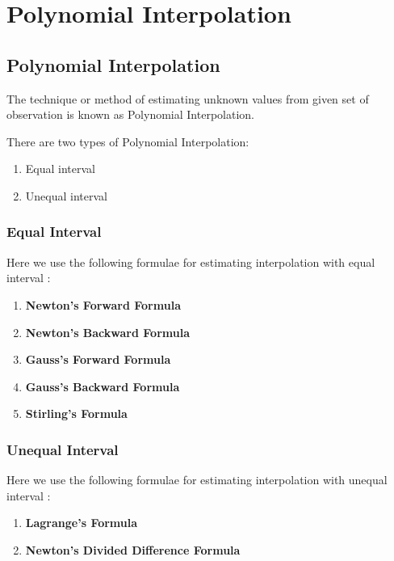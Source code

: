 \newpage
\chapter{Polynomial Interpolation}

\section{Polynomial Interpolation}

The technique or method of estimating unknown values from given set of observation is known as Polynomial Interpolation.

There are two types of Polynomial Interpolation:

\begin{enumerate}
    \item Equal interval
    \item Unequal interval
\end{enumerate}

\subsection{Equal Interval}

Here we use the following formulae for estimating interpolation with equal interval :
\begin{enumerate}
    \item \textbf{Newton's Forward Formula}
    \item \textbf{Newton's Backward Formula}
    \item \textbf{Gauss's Forward Formula}
    \item \textbf{Gauss's Backward Formula}
    \item \textbf{Stirling's Formula}
\end{enumerate}

\subsection{Unequal Interval}

Here we use the following formulae for estimating interpolation with unequal interval :
\begin{enumerate}
    \item \textbf{Lagrange's Formula}
    \item \textbf{Newton's Divided Difference Formula}
\end{enumerate}








